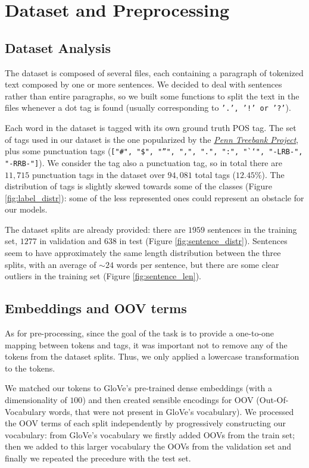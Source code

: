 \documentclass[letterpaper,10.8pt]{article}
\begin{document}
\section{Dataset and Preprocessing}
\subsection{Dataset Analysis}
The dataset is composed of several files, each containing a paragraph of tokenized text composed by one or more sentences. We decided to deal with sentences rather than entire paragraphs, so we built some functions to split the text in the files whenever a dot tag is found (usually corresponding to \texttt{'.', '!' or '?'}).

Each word in the dataset is tagged with its own ground truth POS tag. The set of tags used in our dataset is the one popularized by the \href{https://www.ling.upenn.edu/courses/Fall_2003/ling001/penn_treebank_pos.html}{\emph{Penn Treebank Project}}, plus some punctuation tags (\texttt{["\#", "\$", "''", ",", ".", ":", "``", "-LRB-", "-RRB-"]}). We consider the  tag also a punctuation tag, so in total there are $11,715$ punctuation tags in the dataset over $94,081$ total tags ($12.45\%$). The distribution of tags is slightly skewed towards some of the classes (Figure \ref{fig:label_distr}): some of the less represented ones could represent an obstacle for our models.

The dataset splits are already provided: there are $1959$ sentences in the training set, $1277$ in validation and $638$ in test (Figure \ref{fig:sentence_distr}). Sentences seem to have approximately the same length distribution between the three splits, with an average of $\sim 24$ words per sentence, but there are some clear outliers in the training set (Figure \ref{fig:sentence_len}). 

\subsection{Embeddings and OOV terms}
As for pre-processing, since the goal of the task is to provide a one-to-one mapping between tokens and tags, it was important not to remove any of the tokens from the dataset splits. Thus, we only applied a lowercase transformation to the tokens.

We matched our tokens to GloVe's pre-trained dense embeddings (with a dimensionality of $100$) and then created sensible encodings for OOV (Out-Of-Vocabulary words, that were not present in GloVe's vocabulary). We processed the OOV terms of each split independently by progressively constructing our vocabulary: from GloVe's vocabulary we firstly added OOVs from the train set; then we added to this larger vocabulary the OOVs from the validation set and finally we repeated the precedure with the test set.
\end{document}
